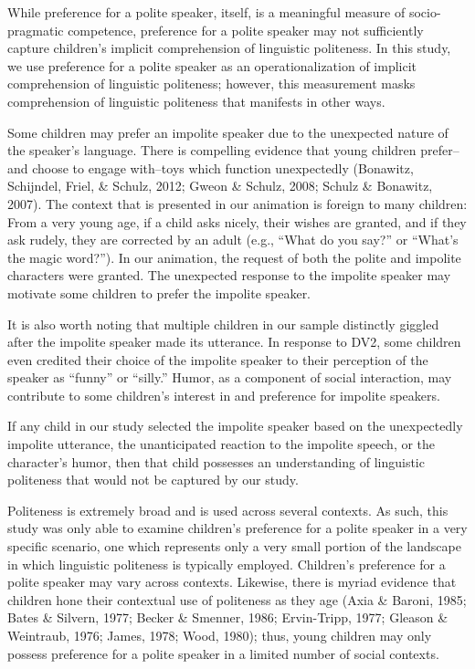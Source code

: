 \documentclass[
  english,
  man,floatsintext]{apa6}
\begin{document}
While preference for a polite speaker, itself, is a meaningful measure of socio-pragmatic competence, preference for a polite speaker may not sufficiently capture children's implicit comprehension of linguistic politeness. In this study, we use preference for a polite speaker as an operationalization of implicit comprehension of linguistic politeness; however, this measurement masks comprehension of linguistic politeness that manifests in other ways.

Some children may prefer an impolite speaker due to the unexpected nature of the speaker's language. There is compelling evidence that young children prefer--and choose to engage with--toys which function unexpectedly (Bonawitz, Schijndel, Friel, \& Schulz, 2012; Gweon \& Schulz, 2008; Schulz \& Bonawitz, 2007). The context that is presented in our animation is foreign to many children: From a very young age, if a child asks nicely, their wishes are granted, and if they ask rudely, they are corrected by an adult (e.g., ``What do you say?'' or ``What's the magic word?''). In our animation, the request of both the polite and impolite characters were granted. The unexpected response to the impolite speaker may motivate some children to prefer the impolite speaker.

It is also worth noting that multiple children in our sample distinctly giggled after the impolite speaker made its utterance. In response to DV2, some children even credited their choice of the impolite speaker to their perception of the speaker as ``funny'' or ``silly.'' Humor, as a component of social interaction, may contribute to some children's interest in and preference for impolite speakers.

If any child in our study selected the impolite speaker based on the unexpectedly impolite utterance, the unanticipated reaction to the impolite speech, or the character's humor, then that child possesses an understanding of linguistic politeness that would not be captured by our study.

Politeness is extremely broad and is used across several contexts. As such, this study was only able to examine children's preference for a polite speaker in a very specific scenario, one which represents only a very small portion of the landscape in which linguistic politeness is typically employed. Children's preference for a polite speaker may vary across contexts. Likewise, there is myriad evidence that children hone their contextual use of politeness as they age (Axia \& Baroni, 1985; Bates \& Silvern, 1977; Becker \& Smenner, 1986; Ervin-Tripp, 1977; Gleason \& Weintraub, 1976; James, 1978; Wood, 1980); thus, young children may only possess preference for a polite speaker in a limited number of social contexts.
\end{document}
